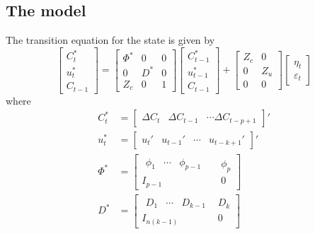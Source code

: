 \subsection{The model}
The transition equation for the state is  given by
\begin{equation}
	\begin{bmatrix}
		C_t^\ast \\ u_t^\ast \\ C_{t-1}
	\end{bmatrix}
	=
	\begin{bmatrix}
		\Phi^\ast & 0 & 0 \\ 0 & D^\ast & 0 \\ Z_c & 0 & 1
	\end{bmatrix}
	\begin{bmatrix}
		C_{t-1}^\ast \\ u_{t-1}^\ast \\ C_{t-1}
	\end{bmatrix}
	+ 
	\begin{bmatrix}
		Z_c & 0 \\ 0 & Z_u \\ 0 & 0
	\end{bmatrix}
	\begin{bmatrix}
		\eta_t \\ \varepsilon_t
	\end{bmatrix}
\end{equation}
where 
\begin{equation}
	\begin{aligned}
		C_{t}^\ast &= 
		\begin{bmatrix}
			\Delta C_t &	\Delta C_{t-1} &\cdots \Delta C_{t-p+1}
		\end{bmatrix}'
		\\
		u_t^\ast &= 
		\begin{bmatrix}
			u_t' & u_{t-1}' & \cdots & u_{t-k+1}'
		\end{bmatrix}'
		\\
		\Phi^\ast &=
		\begin{bmatrix}
			\begin{matrix}
				\phi_1 & \cdots  &\phi_{p-1} &
			\end{matrix} & \phi_p\\
			I_{p-1} & 0 
		\end{bmatrix}
		\\
		D^\ast &=
		\begin{bmatrix}
			\begin{matrix}
				D_1  & \cdots & D_{k-1} 
			\end{matrix}& D_k\\
			I_{n(k-1)} & 0 
		\end{bmatrix}
	\end{aligned}
\end{equation}
